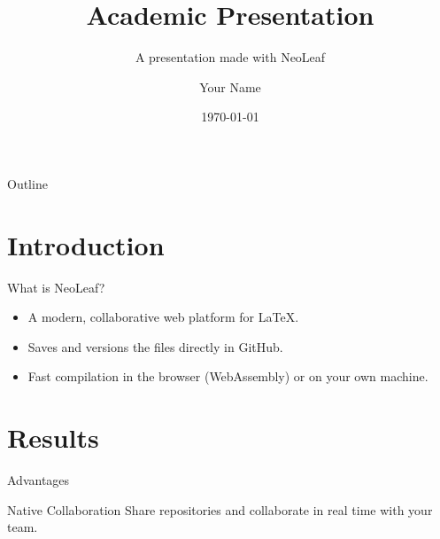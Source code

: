 \documentclass{beamer}
\title{Academic Presentation}
\subtitle{A presentation made with NeoLeaf}
\author{Your Name}
\institute{University / Company}
\date{\today}
\begin{document}
\begin{frame}
  \titlepage
\end{frame}

\begin{frame}{Outline}
  \tableofcontents
\end{frame}

\section{Introduction}
\begin{frame}{What is NeoLeaf?}
  \begin{itemize}
    \item A modern, collaborative web platform for LaTeX.
    \item Saves and versions the files directly in GitHub.
    \item Fast compilation in the browser (WebAssembly) or on your own machine.
  \end{itemize}
\end{frame}

\section{Results}
\begin{frame}{Advantages}
  \begin{block}{Native Collaboration}
    Share repositories and collaborate in real time with your team.
  \end{block}
\end{frame}
\end{document}
